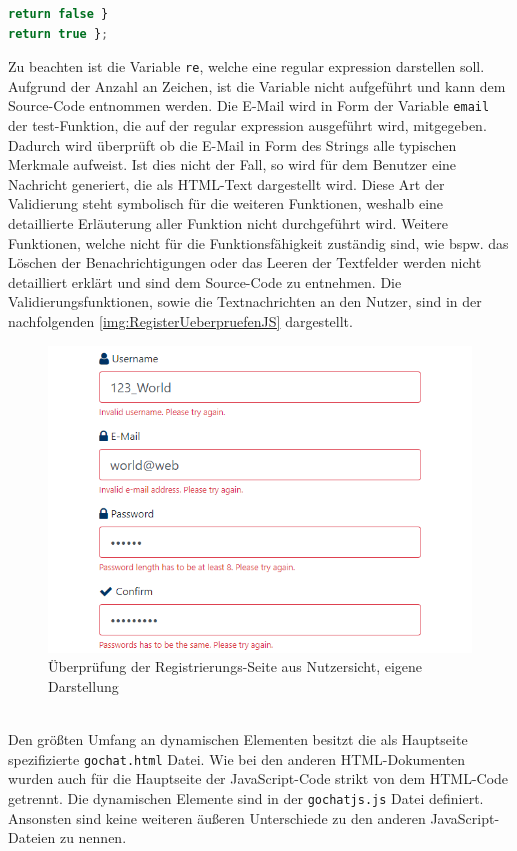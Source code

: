 \documentclass[a4paper,titlepage,halfparskip,12pt]{scrreprt}
\begin{document}
\begin{onehalfspacing}
\begin{lstlisting}[language=Javascript,caption=Validierungsfunktion \textit{validateEmail()},label={lst:RegisterValidateFunction}]
return false }
return true };
\end{lstlisting}
Zu beachten ist die Variable \texttt{re}, welche eine regular expression darstellen soll. Aufgrund der Anzahl an Zeichen, ist die Variable nicht aufgeführt und kann dem Source-Code entnommen werden. Die E-Mail wird in Form der Variable \texttt{email} der test-Funktion, die auf der regular expression ausgeführt wird, mitgegeben. Dadurch wird überprüft ob die E-Mail in Form des Strings alle typischen Merkmale aufweist. Ist dies nicht der Fall, so wird für dem Benutzer eine Nachricht generiert, die als \ac{HTML}-Text dargestellt wird. Diese Art der Validierung steht symbolisch für die weiteren Funktionen, weshalb eine detaillierte Erläuterung aller Funktion nicht durchgeführt wird. Weitere Funktionen, welche nicht für die Funktionsfähigkeit zuständig sind, wie bspw. das Löschen der Benachrichtigungen oder das Leeren der Textfelder werden nicht detailliert erklärt und sind dem Source-Code zu entnehmen. Die Validierungsfunktionen, sowie die Textnachrichten an den Nutzer, sind in der nachfolgenden \autoref{img:RegisterUeberpruefenJS} dargestellt.
\begin{figure}[h]
	\centering
	\includegraphics[scale=0.8]{images/RegisterUeberpruefenJS}
	\caption{Überprüfung der Registrierungs-Seite aus Nutzersicht, eigene Darstellung}
	\label{img:RegisterUeberpruefenJS}
\end{figure}\\
Den größten Umfang an dynamischen Elementen besitzt die als Hauptseite spezifizierte \texttt{gochat.html} Datei. Wie bei den anderen HTML-Dokumenten wurden auch für die Hauptseite der JavaScript-Code strikt von dem HTML-Code getrennt. Die dynamischen Elemente sind in der \texttt{gochatjs.js} Datei definiert. Ansonsten sind keine weiteren äußeren Unterschiede zu den anderen JavaScript-Dateien zu nennen. 

\end{onehalfspacing}
\end{document}
